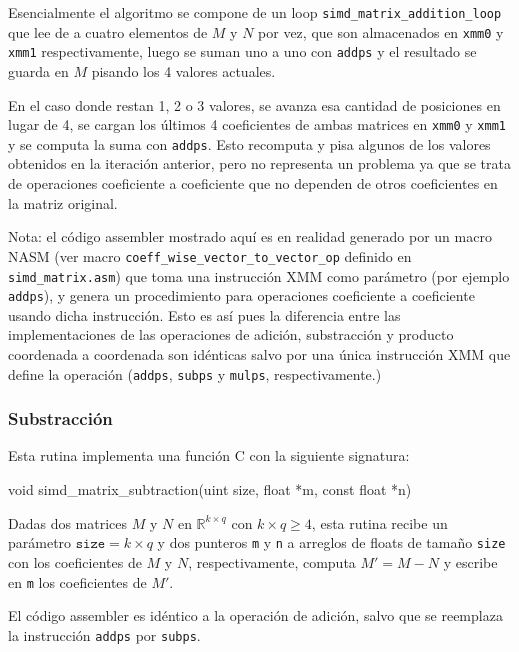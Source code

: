 \documentclass[a4paper, 10pt, twoside]{article}
\newcommand{\cc}[1]{\texttt{#1}}
\begin{document}
Esencialmente el algoritmo se compone de un loop
\cc{simd\_matrix\_addition\_loop} que lee de a cuatro elementos de $M$ y $N$
por vez, que son almacenados en \cc{xmm0} y \cc{xmm1} respectivamente, luego se
suman uno a uno con \cc{addps} y el resultado se guarda en $M$ pisando los 4
valores actuales.

En el caso donde restan 1, 2 o 3 valores, se avanza esa cantidad de posiciones
en lugar de 4, se cargan los últimos 4 coeficientes de ambas matrices en
\cc{xmm0} y \cc{xmm1} y se computa la suma con \cc{addps}. Esto recomputa y
pisa algunos de los valores obtenidos en la iteración anterior, pero no
representa un problema ya que se trata de operaciones coeficiente a coeficiente
que no dependen de otros coeficientes en la matriz original.

Nota: el código assembler mostrado aquí es en realidad generado por un macro
NASM (ver macro \cc{coeff\_wise\_vector\_to\_vector\_op} definido en
\cc{simd\_matrix.asm}) que toma una instrucción XMM como parámetro (por ejemplo
\cc{addps}), y genera un procedimiento para operaciones coeficiente a
coeficiente usando dicha instrucción. Esto es así pues la diferencia entre las
implementaciones de las operaciones de adición, substracción y producto
coordenada a coordenada son idénticas salvo por una única instrucción XMM que
define la operación (\cc{addps}, \cc{subps} y \cc{mulps}, respectivamente.)


\subsubsection{Substracción}

Esta rutina implementa una función C con la siguiente signatura:

\begin{code}
  void simd_matrix_subtraction(uint size,
                               float *m,
                               const float *n)
\end{code}

Dadas dos matrices $M$ y $N$ en $\mathbb{R}^{k \times q}$ con $k \times q \geq
4$, esta rutina recibe un parámetro $\cc{size} = k \times q$ y dos punteros
\cc{m} y \cc{n} a arreglos de floats de tamaño \cc{size} con los coeficientes
de $M$ y $N$, respectivamente, computa $M' = M - N$ y escribe en \cc{m} los
coeficientes de $M'$.

El código assembler es idéntico a la operación de adición, salvo que se
reemplaza la instrucción \cc{addps} por \cc{subps}.
\end{document}
